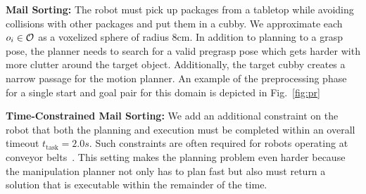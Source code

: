 \documentclass[a4paper]{report}
\begin{document}
\textbf{Mail Sorting:}
The robot must pick up packages from a tabletop while avoiding collisions with other packages and put them in a cubby. We approximate each $o_i \in \mathcal{O}$ as a voxelized sphere of radius 8cm. %
In addition to planning to a grasp pose, the planner needs to search for a valid pregrasp pose which gets harder with more clutter around the target object. Additionally, the target cubby creates a narrow passage for the motion planner.
%
An example of the preprocessing phase for a single start and goal pair for this domain is depicted in Fig.~\ref{fig:pr} 

\textbf{Time-Constrained Mail Sorting:}
We add an additional constraint on the robot that both the planning and execution must be completed within an overall timeout $t_\textrm{task}=2.0s$. Such constraints are often required for robots operating at conveyor belts~\cite{islam2020provably}. This setting makes the planning problem even harder because the manipulation planner not only has to plan fast but also must return a solution that is executable within the remainder of the time.
\end{document}
